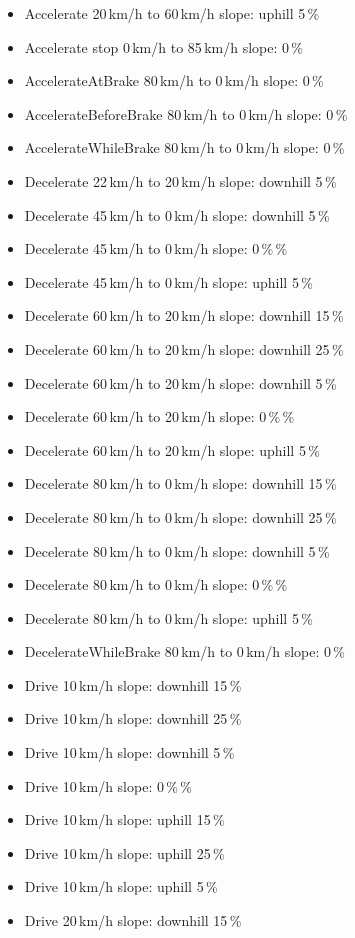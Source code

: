 \begin{itemize}
\item Accelerate 20\,km/h to 60\,km/h slope: uphill 5\,\%
\item Accelerate stop 0\,km/h to 85\,km/h slope:  0\,\%
\item AccelerateAtBrake 80\,km/h to 0\,km/h slope:  0\,\%
\item AccelerateBeforeBrake 80\,km/h to 0\,km/h slope:  0\,\%
\item AccelerateWhileBrake 80\,km/h to 0\,km/h slope:  0\,\%
\item Decelerate 22\,km/h to 20\,km/h slope: downhill 5\,\%
\item Decelerate 45\,km/h to 0\,km/h slope: downhill 5\,\%
\item Decelerate 45\,km/h to 0\,km/h slope:  0\,\%\,\%
\item Decelerate 45\,km/h to 0\,km/h slope: uphill 5\,\%
\item Decelerate 60\,km/h to 20\,km/h slope: downhill 15\,\%
\item Decelerate 60\,km/h to 20\,km/h slope: downhill 25\,\%
\item Decelerate 60\,km/h to 20\,km/h slope: downhill 5\,\%
\item Decelerate 60\,km/h to 20\,km/h slope:  0\,\%\,\%
\item Decelerate 60\,km/h to 20\,km/h slope: uphill 5\,\%
\item Decelerate 80\,km/h to 0\,km/h slope: downhill 15\,\%
\item Decelerate 80\,km/h to 0\,km/h slope: downhill 25\,\%
\item Decelerate 80\,km/h to 0\,km/h slope: downhill 5\,\%
\item Decelerate 80\,km/h to 0\,km/h slope:  0\,\%\,\%
\item Decelerate 80\,km/h to 0\,km/h slope: uphill 5\,\%
\item DecelerateWhileBrake 80\,km/h to 0\,km/h slope:  0\,\%
\item Drive 10\,km/h slope: downhill 15\,\%
\item Drive 10\,km/h slope: downhill 25\,\%
\item Drive 10\,km/h slope: downhill 5\,\%
\item Drive 10\,km/h slope:  0\,\%\,\%
\item Drive 10\,km/h slope: uphill 15\,\%
\item Drive 10\,km/h slope: uphill 25\,\%
\item Drive 10\,km/h slope: uphill 5\,\%
\item Drive 20\,km/h slope: downhill 15\,\%

\end{itemize}
